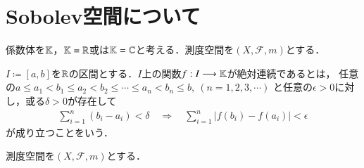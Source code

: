 \section{Sobolev空間について}
係数体を$\mathbb{K}$，$\mathbb{K} = \mathbb{R}$或は$\mathbb{K} = \mathbb{C}$と考える．測度空間を$(X,\mathcal{F},m)$とする．

\begin{dfn}[絶対連続関数]
	$I \coloneqq [a,b]$を$\mathbb{R}$の区間とする．$I$上の関数$f:I \longrightarrow \mathbb{K}$が絶対連続であるとは，
	任意の$a \leq a_1 < b_1 \leq a_2 < b_2 \leq \cdots \leq a_n < b_n \leq b,\ (n = 1,2,3,\cdots)$
	と任意の$\epsilon > 0$に対し，或る$\delta > 0$が存在して
	\begin{align}
		\sum_{i = 1}^{n}(b_i - a_i) < \delta \quad \Rightarrow \quad 
		\sum_{i = 1}^{n}|f(b_i) - f(a_i)| < \epsilon
	\end{align}
	が成り立つことをいう．
\end{dfn}

\begin{thm}[絶対連続の同値条件]
	測度空間を$(X,\mathcal{F},m)$とする．
\end{thm}

\begin{dfn}[Sobolev空間]
\end{dfn}